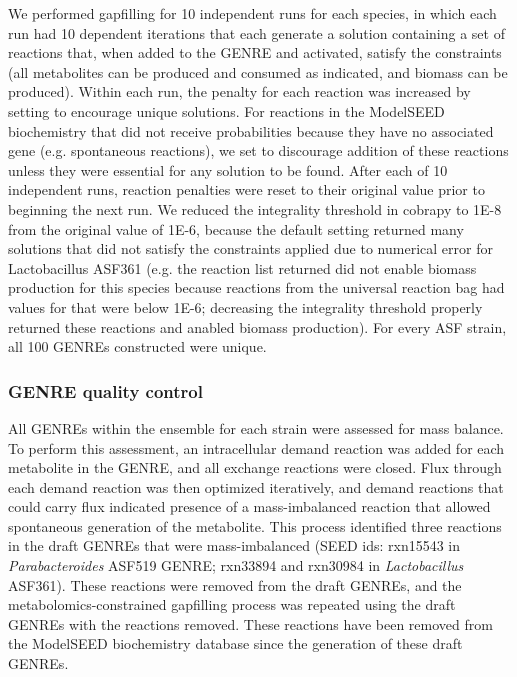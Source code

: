 \documentclass[11pt,twocolumn,notitlepage,openany,twoside]{book}
\begin{document}
\begin{refsection}
We performed gapfilling for 10 independent runs for each species, in which each run had 10 dependent iterations that each generate a solution containing a set of reactions that, when added to the GENRE and activated, satisfy the constraints (all metabolites can be produced and consumed as indicated, and biomass can be produced). Within each run, the penalty for each reaction was increased by setting  to encourage unique solutions. For reactions in the ModelSEED biochemistry that did not receive probabilities because they have no associated gene (e.g. spontaneous reactions), we set  to discourage addition of these reactions unless they were essential for any solution to be found. After each of 10 independent runs, reaction penalties were reset to their original value prior to beginning the next run. We reduced the integrality threshold in cobrapy to 1E-8 from the original value of 1E-6, because the default setting returned many solutions that did not satisfy the constraints applied due to numerical error for Lactobacillus ASF361 (e.g. the reaction list returned did not enable biomass production for this species because reactions from the universal reaction bag had values for  that were below 1E-6; decreasing the integrality threshold properly returned these reactions and anabled biomass production). For every ASF strain, all 100 GENREs constructed were unique.

\subsubsection{GENRE quality control}

All GENREs within the ensemble for each strain were assessed for mass balance. To perform this assessment, an intracellular demand reaction was added for each metabolite in the GENRE, and all exchange reactions were closed. Flux through each demand reaction was then optimized iteratively, and demand reactions that could carry flux indicated presence of a mass-imbalanced reaction that allowed spontaneous generation of the metabolite. This process identified three reactions in the draft GENREs that were mass-imbalanced (SEED ids: rxn15543 in \textit{Parabacteroides} ASF519 GENRE; rxn33894 and rxn30984 in \textit{Lactobacillus} ASF361). These reactions were removed from the draft GENREs, and the metabolomics-constrained gapfilling process was repeated using the draft GENREs with the reactions removed. These reactions have been removed from the ModelSEED biochemistry database since the generation of these draft GENREs.


\end{refsection}
\end{document}
